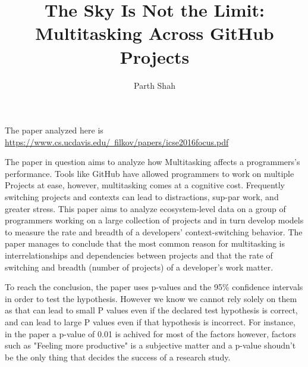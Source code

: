 \documentclass[11pt]{article}
\title{The Sky Is Not the Limit: Multitasking Across GitHub Projects}
\author{Parth Shah}
\begin{document}
\maketitle
\begin{center}    
    The paper analyzed here is \href{https://www.cs.ucdavis.edu/~filkov/papers/icse2016focus.pdf}{https://www.cs.ucdavis.edu/~filkov/papers/icse2016focus.pdf}
\end{center}

The paper in question aims to analyze how Multitasking affects a programmers's
performance. Tools like GitHub have allowed programmers to work on multiple Projects
at ease, however, multitasking comes at a cognitive cost. Frequently switching projects 
and contexts can lead to distractions, sup-par work, and greater stress. 
This paper aims to analyze ecosystem-level data on a group of programmers
working on a large collection of projects and in turn develop models to measure
the rate and breadth of a developers’ context-switching behavior.
The paper manages to conclude that the most common reason for
multitasking is interrelationships and dependencies between
projects and that the rate of switching and breadth 
(number of projects) of a developer’s work matter.

To reach the conclusion, the paper uses p-values and the 95\% confidence 
intervals in order to test the hypothesis. However we know we cannot rely 
solely on them as that can lead to small P values even if the declared 
test hypothesis is correct, and can lead to large P values even if that 
hypothesis is incorrect. For instance, in the paper a p-value of 0.01 is achived
for most of the factors however, factors such as "Feeling more productive" is
a subjective matter and a p-value shoudn't be the only thing that decides
the success of a research study.
\end{document}

